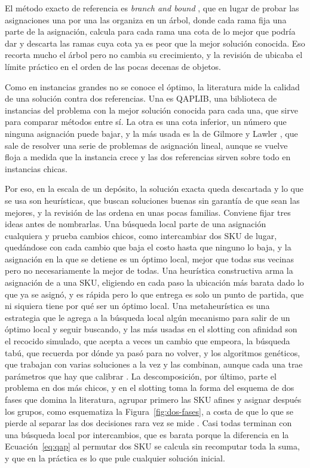 El método exacto de referencia es \emph{branch and bound} \citep{land1960automatic}, que en lugar de probar las asignaciones una por una las organiza en un árbol, donde cada rama fija una parte de la asignación, calcula para cada rama una cota de lo mejor que podría dar y descarta las ramas cuya cota ya es peor que la mejor solución conocida.
Eso recorta mucho el árbol pero no cambia su crecimiento, y la revisión de \citet{loiola2007qap} ubicaba el límite práctico en el orden de las pocas decenas de objetos.

Como en instancias grandes no se conoce el óptimo, la literatura mide la calidad de una solución contra dos referencias.
Una es QAPLIB, una biblioteca de instancias del problema con la mejor solución conocida para cada una, que sirve para comparar métodos entre sí.
La otra es una cota inferior, un número que ninguna asignación puede bajar, y la más usada es la de Gilmore y Lawler \citep{gilmore1962optimal, lawler1963quadratic}, que sale de resolver una serie de problemas de asignación lineal, aunque se vuelve floja a medida que la instancia crece y las dos referencias sirven sobre todo en instancias chicas.

Por eso, en la escala de un depósito, la solución exacta queda descartada y lo que se usa son heurísticas, que buscan soluciones buenas sin garantía de que sean las mejores, y la revisión de \citet{loiola2007qap} las ordena en unas pocas familias.
Conviene fijar tres ideas antes de nombrarlas.
Una búsqueda local parte de una asignación cualquiera y prueba cambios chicos, como intercambiar dos SKU de lugar, quedándose con cada cambio que baja el costo hasta que ninguno lo baja, y la asignación en la que se detiene es un óptimo local, mejor que todas sus vecinas pero no necesariamente la mejor de todas.
Una heurística constructiva arma la asignación de a una SKU, eligiendo en cada paso la ubicación más barata dado lo que ya se asignó, y es rápida pero lo que entrega es solo un punto de partida, que ni siquiera tiene por qué ser un óptimo local.
Una metaheurística es una estrategia que le agrega a la búsqueda local algún mecanismo para salir de un óptimo local y seguir buscando, y las más usadas en el slotting con afinidad son el recocido simulado, que acepta a veces un cambio que empeora, la búsqueda tabú, que recuerda por dónde ya pasó para no volver, y los algoritmos genéticos, que trabajan con varias soluciones a la vez y las combinan, aunque cada una trae parámetros que hay que calibrar \citep{li2015dynamic}.
La descomposición, por último, parte el problema en dos más chicos, y en el slotting toma la forma del esquema de dos fases que domina la literatura, agrupar primero las SKU afines y asignar después los grupos, como esquematiza la Figura~\ref{fig:dos-fases}, a costa de que lo que se pierde al separar las dos decisiones rara vez se mide \citep{islam2023cslap}.
Casi todas terminan con una búsqueda local por intercambios, que es barata porque la diferencia en la Ecuación~\ref{eq:qap} al permutar dos SKU se calcula sin recomputar toda la suma, y que en la práctica es lo que pule cualquier solución inicial.

